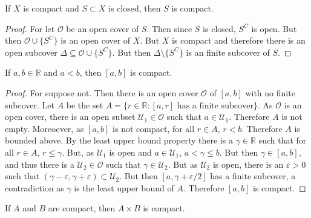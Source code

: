 \documentclass[crop=false,class=book,oneside]{standalone}
\begin{document}
            \begin{theorem}
                If $X$ is compact and
                $S\subset{X}$ is closed, then
                $S$ is compact.
            \end{theorem}
            \begin{proof}
                For let $\mathcal{O}$ be an open cover
                of $S$. Then since $S$ is closed, $S^{C}$
                is open. But then $\mathcal{O}\cup\{S^{C}\}$ is an open
                cover of $X$. But $X$ is compact and therefore
                there is an open subcover $\Delta\subseteq\mathcal{O}\cup\{S^{C}\}$.
                But then $\Delta\setminus\{S^{C}\}$ is an finite subcover of $S$.
            \end{proof}
            \begin{theorem}
                If $a,b\in\mathbb{R}$ and $a<b$, then
                $[a,b]$ is compact.
            \end{theorem}
            \begin{proof}
                For suppose not. Then there is an open
                cover $\mathcal{O}$ of $[a,b]$ with no finite
                subcover. Let $A$ be the set
                $A=\{r\in\mathbb{R}:[a,r]%
                     \textrm{ has a finite subcover}\}$.
                As $\mathcal{O}$ is an open cover, there is
                an open subset $\mathcal{U}_{1}\in\mathcal{O}$ such
                that $a\in\mathcal{U}_{1}$. Therefore $A$ is
                not empty. Moreoever, as $[a,b]$ is not compact,
                for all $r\in{A}$, $r<b$. Therefore $A$ is bounded
                above. By the least upper bound property there
                is a $\gamma\in\mathbb{R}$ such that for
                all $r\in{A}$, $r\leq\gamma$. But, as
                $\mathcal{U}_{1}$ is open and $a\in\mathcal{U}_{1}$,
                $a<\gamma\leq{b}$. But then $\gamma\in[a,b]$, and
                thus there is a $\mathcal{U}_{2}\in\mathcal{O}$ such that
                $\gamma\in\mathcal{U}_{2}$. But as $\mathcal{U}_{2}$ is
                open, there is an $\varepsilon>0$ such that
                $(\gamma-\varepsilon,\gamma+\varepsilon)\subset\mathcal{U}_{2}$.
                But then $[a,\gamma+\varepsilon/2]$ has a finite subcover,
                a contradiction as $\gamma$ is the least upper bound
                of $A$. Therefore $[a,b]$ is compact.
            \end{proof}
            \begin{theorem}
                \label{theorem:surgery_theory_product_of_compact_is_compact}
                If $A$ and $B$ are compact, then
                $A\times{B}$ is compact.
            \end{theorem}
\end{document}
